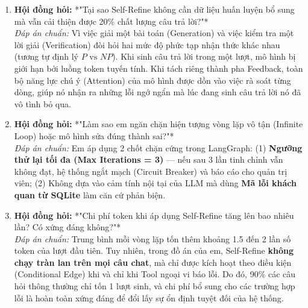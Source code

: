\documentclass[11pt,a4paper]{article}
\begin{document}
\begin{deepdivebox}
\begin{enumerate}[leftmargin=1.5em]
    \item \textbf{Hội đồng hỏi:} *"Tại sao Self-Refine không cần dữ liệu huấn luyện bổ sung mà vẫn cải thiện được 20\% chất lượng câu trả lời?"*\\
    \textit{Đáp án chuẩn:} Vì việc giải một bài toán (Generation) và việc kiểm tra một lời giải (Verification) đòi hỏi hai mức độ phức tạp nhận thức khác nhau (tương tự định lý $P \text{ vs } NP$). Khi sinh câu trả lời trong một lượt, mô hình bị giới hạn bởi luồng token tuyến tính. Khi tách riêng thành pha Feedback, toàn bộ năng lực chú ý (Attention) của mô hình được dồn vào việc rà soát từng dòng, giúp nó nhận ra những lỗi ngớ ngẩn mà lúc đang sinh câu trả lời nó đã vô tình bỏ qua.
    
    \item \textbf{Hội đồng hỏi:} *"Làm sao em ngăn chặn hiện tượng vòng lặp vô tận (Infinite Loop) hoặc mô hình sửa đúng thành sai?"*\\
    \textit{Đáp án chuẩn:} Em áp dụng 2 chốt chặn cứng trong LangGraph: (1) \textbf{Ngưỡng thử lại tối đa (Max Iterations = 3)} — nếu sau 3 lần tinh chỉnh vẫn không đạt, hệ thống ngắt mạch (Circuit Breaker) và báo cáo cho quản trị viên; (2) Không dựa vào cảm tính nội tại của LLM mà dùng \textbf{Mã lỗi khách quan từ SQLite} làm căn cứ phản biện.

    \item \textbf{Hội đồng hỏi:} *"Chi phí token khi áp dụng Self-Refine tăng lên bao nhiêu lần? Có xứng đáng không?"*\\
    \textit{Đáp án chuẩn:} Trung bình mỗi vòng lặp tốn thêm khoảng 1.5 đến 2 lần số token của lượt đầu tiên. Tuy nhiên, trong đồ án của em, Self-Refine \textbf{không chạy tràn lan trên mọi câu chat}, mà chỉ được kích hoạt theo điều kiện (Conditional Edge) khi và chỉ khi Tool ngoại vi báo lỗi. Do đó, 90\% các câu hỏi thông thường chỉ tốn 1 lượt sinh, và chi phí bổ sung cho các trường hợp lỗi là hoàn toàn xứng đáng để đổi lấy sự ổn định tuyệt đối của hệ thống.
\end{enumerate}
\end{deepdivebox}
\end{document}

